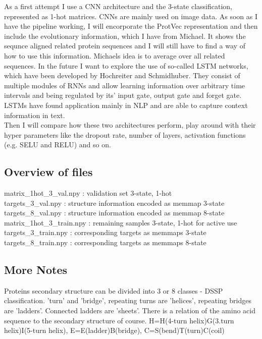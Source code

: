 \documentclass{article}
\begin{document}
As a first attempt I use a CNN architecture and the 3-state classification, represented as 1-hot matrices. CNNs are mainly used on image data. As soon as I have the pipeline working, I will encorporate the ProtVec representation and then include the evolutionary information, which I have from Michael. It shows the sequnce aligned related protein sequences and I will still have to find a way of how to use this information. Michaels idea is to average over all related sequences. In the future I want to explore the use of so-called LSTM networks, which have been developed by Hochreiter and Schmidhuber. They consist of multiple modules of RNNs and allow learning information over arbitrary time intervals and being regulated by its' input gate, output gate and forget gate. LSTMs have found application mainly in NLP and are able to capture context information in text.\\

Then I will compare how these two architectures perform, play around with their hyper parameters like the dropout rate, number of layers, activation functions (e.g. SELU and RELU) and so on. 

\subsection{Overview of files}
matrix\_1hot\_3\_val.npy : validation set 3-state, 1-hot\\

targets\_3\_val.npy : structure information encoded as memmap 3-state\\

targets\_8\_val.npy : structure information encoded as memmap 8-state\\

matrix\_1hot\_3\_train.npy : remaining samples 3-state, 1-hot for active use\\

targets\_3\_train.npy : corresponding targets as memmaps 3-state\\

targets\_8\_train.npy : corresponding targets as memmaps 8-state\\

\subsection{More Notes}

Proteins secondary structure can be divided into 3 or 8 classes - DSSP classification. 'turn' and 'bridge', repeating turns are 'helices', repeating bridges are 'ladders'. Connected ladders are 'sheets'. There is a relation of the amino acid sequence to the secondary structure of course. H=H(4-turn helix)G(3.turn helix)I(5-turn helix), E=E(ladder)B(bridge), C=S(bend)T(turn)C(coil)\\
\end{document}

